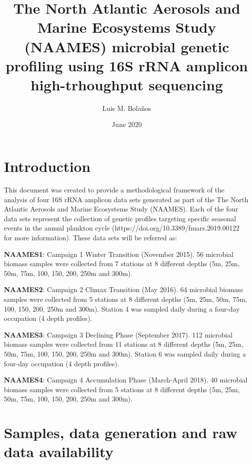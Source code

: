 \documentclass{article}
\begin{document}
\sloppy

\title{The North Atlantic Aerosols and Marine Ecosystems Study (NAAMES) microbial genetic profiling using 16S rRNA amplicon high-trhoughput sequencing}
\author{Luis M. Bola\~nos}
\date{June 2020}
\maketitle

\tableofcontents

\section{Introduction}

This document was created to provide a methodological framework of the analysis of four 16S rRNA amplicon data sets generated as part of the The North Atlantic Aerosols and Marine Ecosystems Study (NAAMES). Each of the four data sets represent the collection of genetic profiles targeting specific seasonal events in the annual plankton cycle (https://doi.org/10.3389/fmars.2019.00122 for more information). These data sets will be referred as: 
\begin{description}\sloppy
\item[$-$]\textbf{NAAMES1}: Campaign 1 Winter Transition (November 2015). 56 microbial biomass samples were collected from 7 stations at 8 different depths (5m, 25m, 50m, 75m, 100, 150, 200, 250m and 300m).
\item[$-$]\textbf{NAAMES2}: Campaign 2 Climax Transition (May 2016). 64 microbial biomass samples were collected from 5 stations at 8 different depths (5m, 25m, 50m, 75m, 100, 150, 200, 250m and 300m). Station 4 was sampled daily during a four-day occupation (4 depth profiles).
\item[$-$]\textbf{NAAMES3}: Campaign 3 Declining Phase (September 2017). 112 microbial biomass samples were collected from 11 stations at 8 different depths (5m, 25m, 50m, 75m, 100, 150, 200, 250m and 300m). Station 6 was sampled daily during a four-day occupation (4 depth profiles).
\item[$-$]\textbf{NAAMES4}: Campaign 4 Accumulation Phase (March-April 2018). 40 microbial biomass samples were collected from 5 stations at 8 different depths (5m, 25m, 50m, 75m, 100, 150, 200, 250m and 300m).

\end{description}
\section{Samples, data generation and raw data availability}\sloppy
\end{document}
